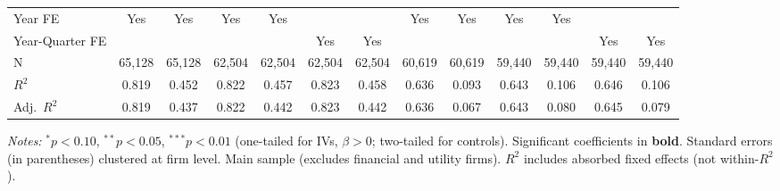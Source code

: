 \documentclass[11pt,a4paper]{article}
\begin{document}
\begin{table}[htbp]
\begin{tabular}{lcccccccccccc}
Year FE & Yes & Yes & Yes & Yes &  &  & Yes & Yes & Yes & Yes &  &  \\
Year-Quarter FE &  &  &  &  & Yes & Yes &  &  &  &  & Yes & Yes \\
\midrule
N & 65,128 & 65,128 & 62,504 & 62,504 & 62,504 & 62,504 & 60,619 & 60,619 & 59,440 & 59,440 & 59,440 & 59,440 \\
$R^2$ & 0.819 & 0.452 & 0.822 & 0.457 & 0.823 & 0.458 & 0.636 & 0.093 & 0.643 & 0.106 & 0.646 & 0.106 \\
Adj.~$R^2$ & 0.819 & 0.437 & 0.822 & 0.442 & 0.823 & 0.442 & 0.636 & 0.067 & 0.643 & 0.080 & 0.645 & 0.079 \\
\bottomrule
\end{tabular}
\begin{minipage}{\linewidth}
\vspace{2pt}\scriptsize
\textit{Notes:} $^{*}p<0.10$, $^{**}p<0.05$, $^{***}p<0.01$ (one-tailed for IVs, $\beta > 0$; two-tailed for controls).
 Significant coefficients in \textbf{bold}.
 Standard errors (in parentheses) clustered at firm level.
 Main sample (excludes financial and utility firms).
 $R^2$ includes absorbed fixed effects (not within-$R^2$).
\end{minipage}
\end{table}
\clearpage
\end{document}
